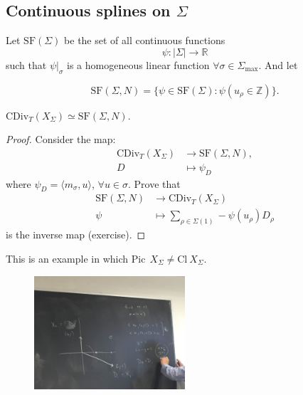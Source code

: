 \documentclass[a4paper,12pt]{amsart}
\newcommand{\ZZ}{\mathbb{Z}}
\newcommand{\RR}{\mathbb{R}}
\newcommand{\CDiv}{\mathrm{CDiv}}
\newcommand{\Picard}{\mathrm{Pic}~}
\newcommand{\Cl}{\mathrm{Cl}~}
\newcommand{\SplineF}[1]{\mathrm{SF}(#1)}
\begin{document}
\subsection{Continuous splines on $\Sigma$}
\begin{Def}
	 Let $\SplineF{\Sigma}$ be the set of all continuous functions
		\begin{equation*}
		\psi:|\Sigma|\to\RR
		\end{equation*}
		such that $\psi|_{\sigma}$ is a homogeneous linear function $\forall\sigma\in\Sigma_{\max}$. And let
		\item \begin{equation*}
			\SplineF{\Sigma,N}=\{\psi\in\SplineF{\Sigma}:\psi(u_{\rho}\in\ZZ)\}.
		\end{equation*}
\end{Def}
\begin{Proposition}
	$\CDiv_{T}(X_{\Sigma})\simeq\SplineF{\Sigma,N}$.
\end{Proposition}
\begin{proof}Consider the map:
	\begin{align*}
		\CDiv_{T}(X_{\Sigma})&\to\SplineF{\Sigma,N},\\
		D&\mapsto\psi_{D}
	\end{align*}
	where $\psi_{D}=\langle m_\sigma,u\rangle$, $\forall u\in\sigma$. Prove that
	\begin{align*}
		\SplineF{\Sigma,N}&\to\CDiv_{T}(X_{\Sigma})\\
		\psi&\mapsto\sum_{\rho\in\Sigma(1)}-\psi(u_{\rho})D_{\rho}
	\end{align*}
	is the inverse map (exercise).
\end{proof}
\begin{Eg}This is an example in which $\Picard~X_{\Sigma}\neq\Cl X_{\Sigma}$.
		\begin{figure}[h]
			\centering
			\includegraphics[width=0.5\textwidth]{pic/Apr11_eg1}
		\end{figure}
\end{Eg}
\end{document}
